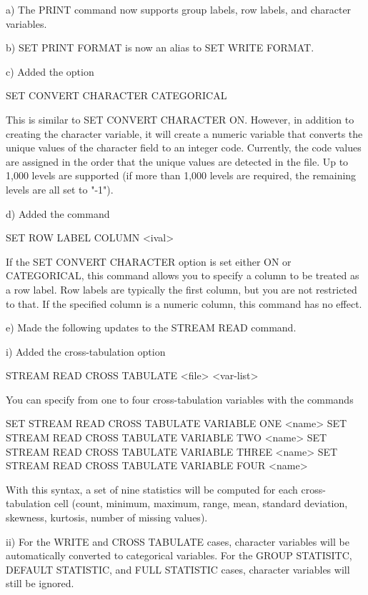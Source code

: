     a) The PRINT command now supports group labels, row labels, and
       character variables.

    b) SET PRINT FORMAT is now an alias to SET WRITE FORMAT.

    c) Added the option

         SET CONVERT CHARACTER CATEGORICAL

       This is similar to SET CONVERT CHARACTER ON.  However, in
       addition to creating the character variable, it will create
       a numeric variable that converts the unique values of the
       character field to an integer code.  Currently, the code values
       are assigned in the order that the unique values are detected
       in the file.  Up to 1,000 levels are supported (if more than
       1,000 levels are required, the remaining levels are all set
       to "-1").

    d) Added the command

         SET ROW LABEL COLUMN <ival>

       If the SET CONVERT CHARACTER option is set either ON or
       CATEGORICAL, this command allows you to specify a column to be
       treated as a row label.  Row labels are typically the first
       column, but you are not restricted to that.  If the specified
       column is a numeric column, this command has no effect.

    e) Made the following updates to the STREAM READ command.

         i) Added the cross-tabulation option

               STREAM READ CROSS TABULATE <file>  <var-list>

            You can specify from one to four cross-tabulation variables
            with the commands

               SET STREAM READ CROSS TABULATE VARIABLE ONE <name>
               SET STREAM READ CROSS TABULATE VARIABLE TWO <name>
               SET STREAM READ CROSS TABULATE VARIABLE THREE <name>
               SET STREAM READ CROSS TABULATE VARIABLE FOUR <name>

            With this syntax, a set of nine statistics will be computed
            for each cross-tabulation cell (count, minimum, maximum,
            range, mean, standard deviation, skewness, kurtosis, number
            of missing values).

        ii) For the WRITE and CROSS TABULATE cases, character variables
            will be automatically converted to categorical variables.  For
            the GROUP STATISITC, DEFAULT STATISTIC, and FULL STATISTIC
            cases, character variables will still be ignored.

